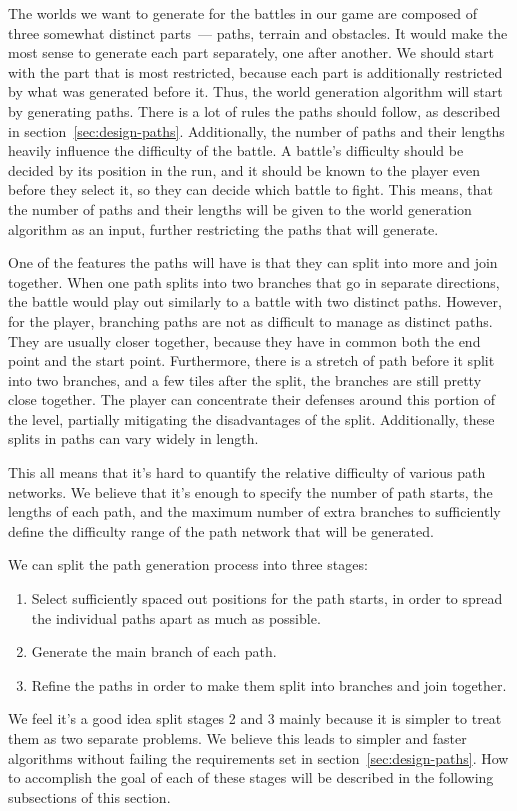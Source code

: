 The worlds we want to generate for the battles in our game are composed of three somewhat distinct parts~--- paths, terrain and obstacles.
It would make the most sense to generate each part separately, one after another.
We should start with the part that is most restricted, because each part is additionally restricted by what was generated before it.
Thus, the world generation algorithm will start by generating paths.
There is a lot of rules the paths should follow, as described in section~\ref{sec:design-paths}.
Additionally, the number of paths and their lengths heavily influence the difficulty of the battle.
A battle's difficulty should be decided by its position in the run, and it should be known to the player even before they select it, so they can decide which battle to fight.
This means, that the number of paths and their lengths will be given to the world generation algorithm as an input, further restricting the paths that will generate.

One of the features the paths will have is that they can split into more and join together.
When one path splits into two branches that go in separate directions, the battle would play out similarly to a battle with two distinct paths.
However, for the player, branching paths are not as difficult to manage as distinct paths.
They are usually closer together, because they have in common both the end point and the start point.
Furthermore, there is a stretch of path before it split into two branches, and a few tiles after the split, the branches are still pretty close together.
The player can concentrate their defenses around this portion of the level, partially mitigating the disadvantages of the split.
Additionally, these splits in paths can vary widely in length.

This all means that it's hard to quantify the relative difficulty of various path networks.
We believe that it's enough to specify the number of path starts, the lengths of each path, and the maximum number of extra branches to sufficiently define the difficulty range of the path network that will be generated.

We can split the path generation process into three stages:
\begin{enumerate}
    \item Select sufficiently spaced out positions for the path starts, in order to spread the individual paths apart as much as possible.
    \item Generate the main branch of each path.
    \item Refine the paths in order to make them split into branches and join together.
\end{enumerate}
We feel it's a good idea split stages 2 and 3 mainly because it is simpler to treat them as two separate problems.
We believe this leads to simpler and faster algorithms without failing the requirements set in section~\ref{sec:design-paths}.
How to accomplish the goal of each of these stages will be described in the following subsections of this section.

